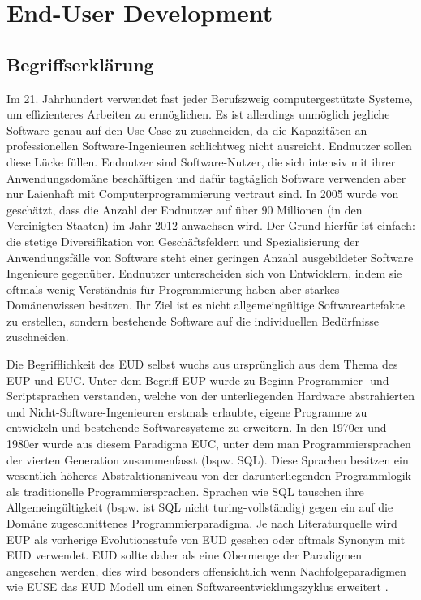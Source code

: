 
\section{End-User Development}
\subsection{Begriffserklärung}
Im 21. Jahrhundert verwendet fast jeder Berufszweig computergestützte Systeme, um effizienteres Arbeiten zu ermöglichen. Es ist allerdings unmöglich jegliche Software genau auf den Use-Case zu zuschneiden, da die Kapazitäten an professionellen Software-Ingenieuren schlichtweg nicht ausreicht. Endnutzer sollen diese Lücke füllen. Endnutzer sind Software-Nutzer, die sich intensiv mit ihrer Anwendungsdomäne beschäftigen und dafür tagtäglich Software verwenden aber nur Laienhaft mit Computerprogrammierung vertraut sind. In 2005 wurde von \cite{Scaffidi2005eudnumbers} geschätzt, dass die Anzahl der Endnutzer auf über 90 Millionen (in den Vereinigten Staaten) im Jahr 2012 anwachsen wird. Der Grund hierfür ist einfach: die stetige Diversifikation von Geschäftsfeldern und Spezialisierung der Anwendungsfälle von Software steht einer geringen Anzahl ausgebildeter Software Ingenieure gegenüber. Endnutzer unterscheiden sich von Entwicklern, indem sie oftmals wenig Verständnis für Programmierung haben aber starkes Domänenwissen besitzen. Ihr Ziel ist es nicht allgemeingültige Softwareartefakte zu erstellen, sondern bestehende Software auf die individuellen Bedürfnisse zuschneiden.

Die Begrifflichkeit des \acf{EUD} selbst wuchs aus ursprünglich aus dem Thema des \ac{EUP} und \ac{EUC}. Unter dem Begriff \ac{EUP} wurde zu Beginn Programmier- und Scriptsprachen verstanden, welche von der unterliegenden Hardware abstrahierten und Nicht-Software-Ingenieuren erstmals erlaubte, eigene Programme zu entwickeln und bestehende Softwaresysteme zu erweitern. In den 1970er und 1980er wurde aus diesem  Paradigma \ac{EUC}, unter dem man Programmiersprachen der vierten Generation zusammenfasst (bspw. SQL). Diese Sprachen besitzen ein wesentlich höheres Abstraktionsniveau von der darunterliegenden Programmlogik als traditionelle Programmiersprachen. Sprachen wie SQL tauschen ihre Allgemeingültigkeit (bspw. ist SQL nicht turing-vollständig) gegen ein auf die Domäne zugeschnittenes Programmierparadigma. Je nach Literaturquelle wird \ac{EUP} als vorherige Evolutionsstufe von \ac{EUD} gesehen oder oftmals Synonym mit \ac{EUD} verwendet. \ac{EUD} sollte daher als eine Obermenge der Paradigmen angesehen werden, dies wird besonders offensichtlich wenn Nachfolgeparadigmen wie \ac{EUSE} das \ac{EUD} Modell um einen Softwareentwicklungszyklus erweitert \cite{Ko2011EUSE}.


